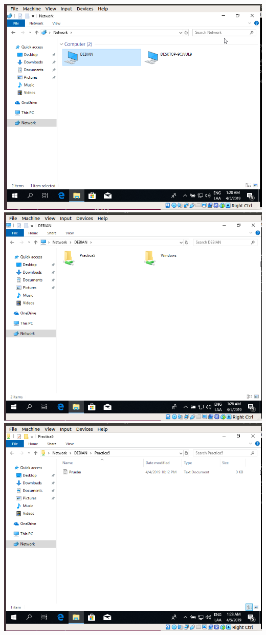 \documentclass[a4paper, 11pt, oneside]{article}
\begin{document}
\begin{itemize}
    \begin{center}
    \includegraphics[scale=0.40]{7.png}
    \includegraphics[scale=0.40]{8.png}
    \includegraphics[scale=0.40]{9.png}
    \end{center}
\end{itemize}
\end{document}
